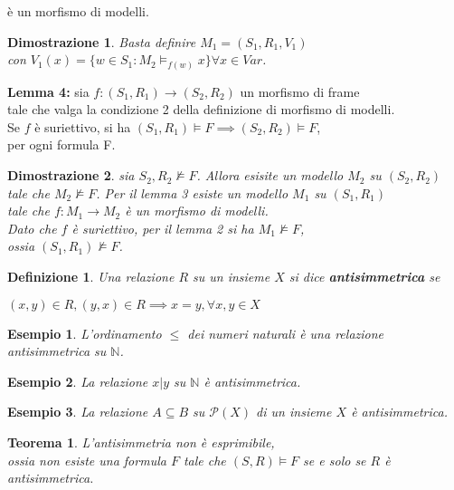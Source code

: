 \documentclass[a4paper,12pt]{article}
\theoremstyle{def}
\newtheorem*{definition}{Definizione}
\theoremstyle{prop}
\theoremstyle{esempio}
\newtheorem*{example}{Esempio}
\theoremstyle{dimostrazione}
\newtheorem*{dimostrazione}{Dimostrazione}
\theoremstyle{teo}
\newtheorem*{teorema}{Teorema}
\theoremstyle{osservazione}
\begin{document}
è un morfismo di modelli.
\begin{dimostrazione}
	Basta definire \(M_1 = (S_1, R_1, V_1)\)\\
	con \(V_1(x) = \{ w \in S_1 : M_2 \vDash_{f(w)} x\} \forall x \in Var\).
\end{dimostrazione}
\textbf{Lemma 4:} sia \(f: (S_1, R_1) \rightarrow (S_2, R_2)\) un morfismo di frame\\
tale che valga la condizione 2 della definizione di morfismo di modelli.\\
Se \(f\) è suriettivo, si ha \((S_1, R_1) \vDash F \implies (S_2, R_2) \vDash F\),\\
per ogni formula F.
\begin{dimostrazione}
	sia \(S_2, R_2 \nvDash F\). Allora esisite un modello \(M_2\) su \((S_2, R_2)\)\\
	tale che \(M_2 \nvDash F\). Per il lemma 3 esiste un modello \(M_1\) su \((S_1, R_1)\)\\
	tale che \(f: M_1 \rightarrow M_2\) è un morfismo di modelli.\\
	Dato che \(f\) è suriettivo, per il lemma 2 si ha \(M_1 \nvDash F\),\\
	ossia \((S_1, R_1) \nvDash F\).\\
\end{dimostrazione}
\newpage
\begin{definition}
	Una relazione \(R\) su un insieme \(X\) si dice \textbf{antisimmetrica} se
	\begin{center}
		\((x,y) \in R, (y,x) \in R \implies x = y, \forall x,y \in X\)
	\end{center}
\end{definition}
\begin{example}
	L'ordinamento \(\leq\) dei numeri naturali è una relazione antisimmetrica su \(\mathbb{N}\).
\end{example}
\begin{example}
	La relazione \(x | y\) su \(\mathbb{N}\) è antisimmetrica.
\end{example}
\begin{example}
	La relazione \(A \subseteq B\) su \(\mathcal{P}(X)\) di un insieme \(X\) è antisimmetrica.
\end{example}
\begin{teorema}
	L'antisimmetria non è esprimibile,\\
	ossia non esiste una formula \(F\) tale che \((S,R) \vDash F\) se e solo se \(R\) è antisimmetrica.
\end{teorema}
\end{document}
